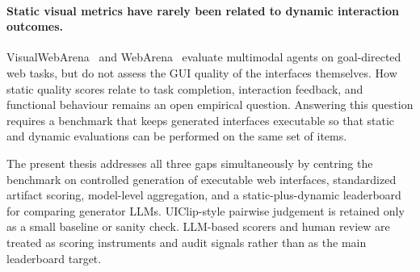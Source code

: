 \paragraph{Static visual metrics have rarely been related to dynamic interaction outcomes.}
VisualWebArena~\cite{visualwebarena} and WebArena~\cite{webarena}
evaluate multimodal agents on goal-directed web tasks, but do not assess
the GUI quality of the interfaces themselves.
How static quality scores relate to task completion, interaction feedback,
and functional behaviour remains an open empirical question.
Answering this question requires a benchmark that keeps generated interfaces
executable so that static and dynamic evaluations can be performed on the
same set of items.

The present thesis addresses all three gaps simultaneously by centring the
benchmark on controlled generation of executable web interfaces, standardized
artifact scoring, model-level aggregation, and a static-plus-dynamic
leaderboard for comparing generator LLMs. UIClip-style pairwise judgement is
retained only as a small baseline or sanity check. LLM-based scorers and human
review are treated as scoring instruments and audit signals rather than as the
main leaderboard target.

